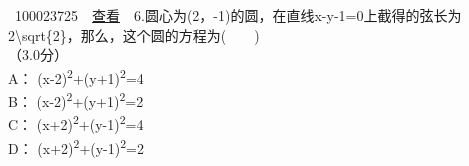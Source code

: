 \documentclass[]{article}
\begin{document}
~100023725~~\href{../question/viewQuestionDetail.jsp?questionID=100023725\&testPaperId=100229072}{查看}~~6.圆心为(2，-1)的圆，在直线x-y-1=0上截得的弦长为2\textbackslash{}sqrt\{2\}，那么，这个圆的方程为(　　)\\
\hspace*{0.333em}\hspace*{0.333em}（3.0分）\\
\hspace*{0.333em}\hspace*{0.333em}\hspace*{0.333em}\hspace*{0.333em}\hspace*{0.333em}\hspace*{0.333em}\hspace*{0.333em}\hspace*{0.333em}A：
(x-2)\textsuperscript{2}+(y+1)\textsuperscript{2}=4\\[2\baselineskip]\hspace*{0.333em}\hspace*{0.333em}\hspace*{0.333em}\hspace*{0.333em}\hspace*{0.333em}\hspace*{0.333em}\hspace*{0.333em}\hspace*{0.333em}B：
(x-2)\textsuperscript{2}+(y+1)\textsuperscript{2}=2\\[2\baselineskip]\hspace*{0.333em}\hspace*{0.333em}\hspace*{0.333em}\hspace*{0.333em}\hspace*{0.333em}\hspace*{0.333em}\hspace*{0.333em}\hspace*{0.333em}C：
(x+2)\textsuperscript{2}+(y-1)\textsuperscript{2}=4\\[2\baselineskip]\hspace*{0.333em}\hspace*{0.333em}\hspace*{0.333em}\hspace*{0.333em}\hspace*{0.333em}\hspace*{0.333em}\hspace*{0.333em}\hspace*{0.333em}D：
(x+2)\textsuperscript{2}+(y-1)\textsuperscript{2}=2
\end{document}
